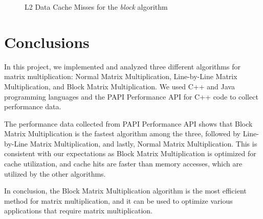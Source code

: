 \documentclass[11pt,a4paper]{article}
\begin{document}
\begin{figure}[H]
    \centering
    \caption{L2 Data Cache Misses for the \emph{block} algorithm}
\end{figure}

\section{Conclusions}

In this project, we implemented and analyzed three different algorithms for matrix multiplication: Normal Matrix Multiplication, Line-by-Line Matrix Multiplication, and Block Matrix Multiplication. We used C++ and Java programming languages and  the PAPI Performance API for C++ code to collect performance data.

The performance data collected from PAPI Performance API shows that Block Matrix Multiplication is the fastest algorithm among the three, followed by Line-by-Line Matrix Multiplication, and lastly, Normal Matrix Multiplication. This is consistent with our expectations as Block Matrix Multiplication is optimized for cache utilization, and cache hits are faster than memory accesses, which are utilized by the other algorithms.


In conclusion, the Block Matrix Multiplication algorithm is the most efficient method for matrix multiplication, and it can be used to optimize various applications that require matrix multiplication. \\
\end{document}
